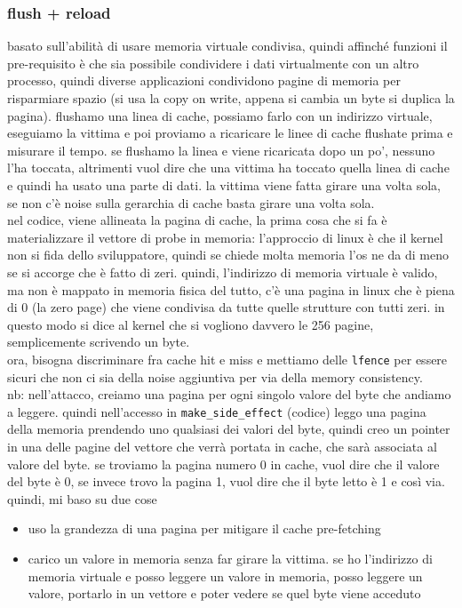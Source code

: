 \documentclass[12pt, oneside]{extbook} %
\begin{document}
\subsubsection{flush + reload}
basato sull'abilità di usare memoria virtuale condivisa, quindi affinché funzioni il pre-requisito è che sia possibile condividere i dati virtualmente con un altro processo, quindi diverse applicazioni condividono pagine di memoria per risparmiare spazio (si usa la copy on write, appena si cambia un byte si duplica la pagina). flushamo una linea di cache, possiamo farlo con un indirizzo virtuale, eseguiamo la vittima e poi proviamo a ricaricare le linee di cache flushate prima e misurare il tempo. se flushamo la linea e viene ricaricata dopo un po', nessuno l'ha toccata, altrimenti vuol dire che una vittima ha toccato quella linea di cache e quindi ha usato una parte di dati. la vittima viene fatta girare una volta sola, se non c'è noise sulla gerarchia di cache basta girare una volta sola.\\ nel codice, viene allineata la pagina di cache, la prima cosa che si fa è materializzare il vettore di probe in memoria: l'approccio di linux è che il kernel non si fida dello sviluppatore, quindi se chiede molta memoria l'os ne da di meno se si accorge che è fatto di zeri. quindi, l'indirizzo di memoria virtuale è valido, ma non è mappato in memoria fisica del tutto, c'è una pagina in linux che è piena di 0 (la zero page) che viene condivisa da tutte quelle strutture con tutti zeri. in questo modo si dice al kernel che si vogliono davvero le 256 pagine, semplicemente scrivendo un byte.\\ ora, bisogna discriminare fra cache hit e miss e mettiamo delle \texttt{lfence} per essere sicuri che non ci sia della noise aggiuntiva per via della memory consistency.\\ nb: nell'attacco, creiamo una pagina per ogni singolo valore del byte che andiamo a leggere. quindi nell'accesso in \texttt{make\_side\_effect} (codice) leggo una pagina della memoria prendendo uno qualsiasi dei valori del byte, quindi creo un pointer in una delle pagine del vettore che verrà portata in cache, che sarà associata al valore del byte. se troviamo la pagina numero 0 in cache, vuol dire che il valore del byte è 0, se invece trovo la pagina 1, vuol dire che il byte letto è 1 e così via.\\ quindi, mi baso su due cose
\begin{itemize}
\item uso la grandezza di una pagina per mitigare il cache pre-fetching
\item carico un valore in memoria senza far girare la vittima. se ho l'indirizzo di memoria virtuale e posso leggere un valore in memoria, posso leggere un valore, portarlo in un vettore e poter vedere se quel byte viene acceduto
\end{itemize}
\end{document}
